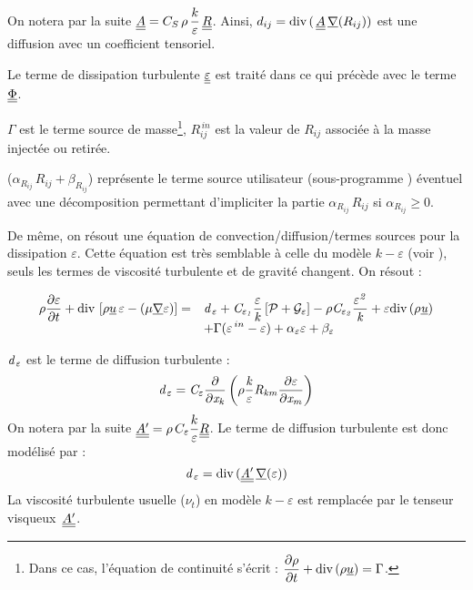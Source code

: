 On notera par la suite $\displaystyle \underline{\underline{A}} = C_S\,\rho\,\frac{k}{\varepsilon}\,\underline{\underline{R}}$. Ainsi, $\displaystyle d_{ij} = \text{div}\,(\,\underline{\underline{A}}\,\underline{\nabla}(R_{ij}))$ est une diffusion avec un coefficient tensoriel.

Le terme de dissipation turbulente $\underline{\underline{\varepsilon}}$ est trait\'e dans ce qui pr\'ec\`ede avec le terme $\underline{\underline{\Phi}}$.

$\Gamma$ est le terme source de masse\footnote{Dans ce cas, l'\'equation de continuit\'e s'\'ecrit : $\displaystyle \frac{\partial \rho}{\partial t} + \text{div}\,{(\rho \underline{u})} = \Gamma$.}, $R^{\,in}_{ij}$ est la valeur de $R_{ij}$ associ\'ee \`a la masse inject\'ee ou retir\'ee.

($\alpha_{R_{ij}}\,R_{ij} + \beta_{R_{ij}}$) repr\'esente le terme source
utilisateur (sous-programme ) \'eventuel avec une d\'ecomposition
permettant d'impliciter la partie $\alpha_{R_{ij}}\,R_{ij}$ si $\alpha_{R_{ij}} \geqslant 0$.

De m\^eme, on r\'esout une \'equation de convection/diffusion/termes sources pour la dissipation $\varepsilon$. Cette \'equation est tr\`es semblable \`a celle du mod\`ele $k-\varepsilon$ (voir ), seuls les termes de viscosit\'e turbulente et de gravit\'e changent. On r\'esout :

\begin{equation}
\begin{array} {ll}
\displaystyle \rho\frac{\partial \varepsilon}{\partial t} +
\text{div}\,\left[\rho \underline{u}\,\varepsilon-
(\mu \underline{\nabla}{\varepsilon})\right] = &
\displaystyle \it{d}_{\,\varepsilon}
+ C_{\varepsilon_1}\frac{\varepsilon}{k}\left[\mathcal{P}
+\mathcal{G}_{\varepsilon}\right]
-\rho C_{\varepsilon_2}\frac{\varepsilon^2}{k}
+\varepsilon\text{div}\,(\rho\underline{u})\\
&
\displaystyle
+\Gamma(\varepsilon^{\,in}-\varepsilon)
+\alpha_\varepsilon \varepsilon +\beta_\varepsilon
\end{array}
\end{equation}


$\it{d}_{\,\varepsilon}$ est le terme de diffusion turbulente :
\begin{equation}
\displaystyle
\it{d}_{\,\varepsilon} = C_{\varepsilon} \displaystyle \frac{\partial}{\partial x_k} \left( \rho \frac{k}{\varepsilon} R_{km} \frac{\partial \varepsilon}{\partial x_m} \right)
\end{equation}
On notera par la suite $\underline{\underline{A'}} = \displaystyle \rho \,C_{\varepsilon} \frac{k}{\varepsilon} \underline{\underline{R}}$.
Le terme de diffusion turbulente est donc mod\'elis\'e par : $$\it{d}_{\,\varepsilon} =
\text{div}\,(\underline{\underline{A'}}\,\underline{\nabla}(\varepsilon))$$
La viscosit\'e turbulente usuelle ($\nu_t$) en mod\`ele $k-\varepsilon$ est remplac\'ee par le tenseur visqueux~$\underline{\underline{A'}}$.

